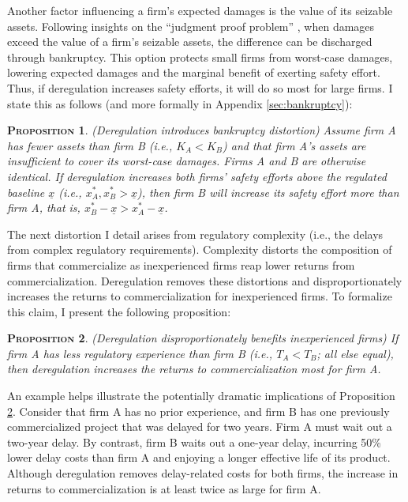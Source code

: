 \documentclass[letterpaper,12pt]{article}
\theoremstyle{definition}
\newtheorem{proposition}{\normalfont\scshape Proposition} %
\begin{document}
Another factor influencing a firm's expected damages is the value of its seizable assets. Following insights on the ``judgment proof problem'' \citep{shavell1986judgment}, when damages exceed the value of a firm's seizable assets, the difference can be discharged through bankruptcy. This option protects small firms from worst-case damages, lowering expected damages and the marginal benefit of exerting safety effort. Thus, if deregulation increases safety efforts, it will do so most for large firms. I state this as follows (and more formally in Appendix \ref{sec:bankruptcy}):
\begin{proposition}\label{prop:4} 
\textit{(Deregulation introduces bankruptcy distortion)}  
\textit{Assume firm A has fewer assets than firm B (i.e., \(K_A < K_B\)) and that firm A’s assets are insufficient to cover its worst-case damages. Firms A and B are otherwise identical. If deregulation increases both firms' safety efforts above the regulated baseline \(\underline{x}\) (i.e., \(x_A^*, x_B^* > \underline{x}\)), then firm B will increase its safety effort more than firm A, that is, $x_B^* - \underline{x} > x_A^* - \underline{x}$.}
\end{proposition}



The next distortion I detail arises from regulatory complexity (i.e., the delays from complex regulatory requirements). Complexity distorts the composition of firms that commercialize as inexperienced firms reap lower returns from commercialization. Deregulation removes these distortions and disproportionately increases the returns to commercialization for inexperienced firms. To formalize this claim, I present the following proposition:\footnotemark {}
\begin{proposition}\label{prop:2} \textit{(Deregulation disproportionately benefits inexperienced firms) If firm A has less regulatory experience than firm B (i.e., $T_A < T_B$; all else equal), then deregulation increases the returns to commercialization most for firm A.}
\end{proposition}

An example helps illustrate the potentially dramatic implications of Proposition \ref{prop:2}. Consider that firm A has no prior experience, and firm B has one previously commercialized project that was delayed for two years. Firm A must wait out a two-year delay. By contrast, firm B waits out a one-year delay, incurring 50\% lower delay costs than firm A and enjoying a longer effective life of its product. Although deregulation removes delay-related costs for both firms, the increase in returns to commercialization is at least twice as large for firm A. 
\end{document}
